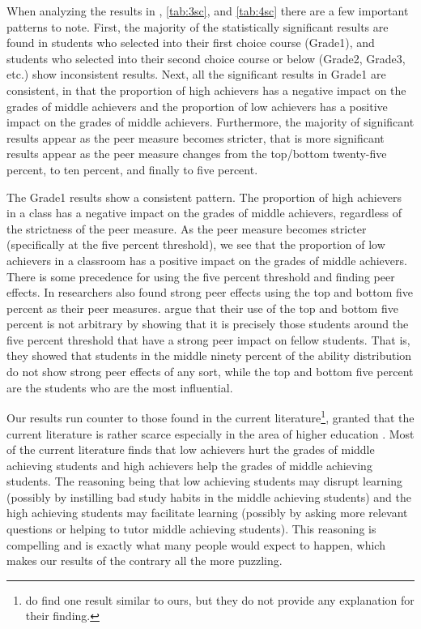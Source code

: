 \clearpage{}

When analyzing the results in , \ref{tab:3sc}, and \ref{tab:4sc} there are a few important patterns to note. 
First, the majority of the statistically significant results are found in students who selected into their first choice course (Grade1), and students who selected into their second choice course or below (Grade2, Grade3, etc.) show inconsistent results. 
Next, all the significant results in Grade1 are consistent, in that the proportion of high achievers has a negative impact on the grades of middle achievers and the proportion of low achievers has a positive impact on the grades of middle achievers. 
Furthermore, the majority of significant results appear as the peer measure becomes stricter, that is more significant results appear as the peer measure changes from the top/bottom twenty-five percent, to ten percent, and finally to five percent. 
 
The Grade1 results show a consistent pattern. 
The proportion of high achievers in a class has a negative impact on the grades of middle achievers, regardless of the strictness of the peer measure. 
As the peer measure becomes stricter (specifically at the five percent threshold), we see that the proportion of low achievers in a classroom has a positive impact on the grades of middle achievers. 
There is some precedence for using the five percent threshold and finding peer effects. 
In \citet{lavy2012good} researchers also found strong peer effects using the top and bottom five percent as their peer measures. 
\citet{lavy2012good} argue that their use of the top and bottom five percent is not arbitrary by showing that it is precisely those students around the five percent threshold that have a strong peer impact on fellow students. 
That is, they showed that students in the middle ninety percent of the ability distribution do not show strong peer effects of any sort, while the top and bottom five percent are the students who are the most influential. 

Our results run counter to those found in the current literature\footnote{\citet{burke2013classroom} do find one result similar to ours, but they do not provide any explanation for their finding.}, granted that the current literature is rather scarce especially in the area of higher education \citep{kang2007classroom,carman2012classroom,burke2013classroom,schlosser2008inside,lavy2012good}. 
Most of the current literature finds that low achievers hurt the grades of middle achieving students and high achievers help the grades of middle achieving students. 
The reasoning being that low achieving students may disrupt learning (possibly by instilling bad study habits in the middle achieving students) and the high achieving students may facilitate learning (possibly by asking more relevant questions or helping to tutor middle achieving students). 
This reasoning is compelling and is exactly what many people would expect to happen, which makes our results of the contrary all the more puzzling.  

